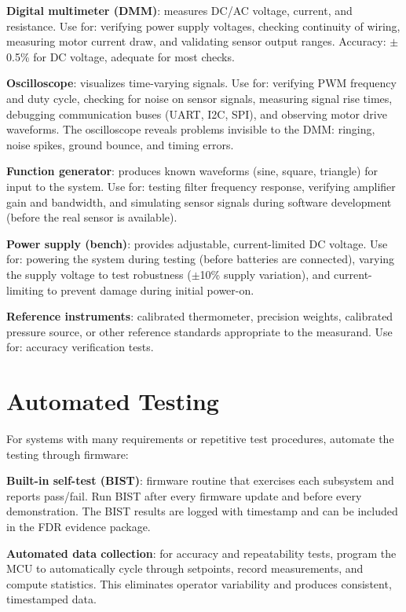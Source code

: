 \documentclass[11pt,letterpaper,twoside,openany]{book}
\begin{document}
\textbf{Digital multimeter (DMM)}: measures DC/AC voltage, current, and resistance. Use for: verifying power supply voltages, checking continuity of wiring, measuring motor current draw, and validating sensor output ranges. Accuracy: $\pm$0.5\% for DC voltage, adequate for most checks.

\textbf{Oscilloscope}: visualizes time-varying signals. Use for: verifying PWM frequency and duty cycle, checking for noise on sensor signals, measuring signal rise times, debugging communication buses (UART, I2C, SPI), and observing motor drive waveforms. The oscilloscope reveals problems invisible to the DMM: ringing, noise spikes, ground bounce, and timing errors.

\textbf{Function generator}: produces known waveforms (sine, square, triangle) for input to the system. Use for: testing filter frequency response, verifying amplifier gain and bandwidth, and simulating sensor signals during software development (before the real sensor is available).

\textbf{Power supply (bench)}: provides adjustable, current-limited DC voltage. Use for: powering the system during testing (before batteries are connected), varying the supply voltage to test robustness ($\pm$10\% supply variation), and current-limiting to prevent damage during initial power-on.

\textbf{Reference instruments}: calibrated thermometer, precision weights, calibrated pressure source, or other reference standards appropriate to the measurand. Use for: accuracy verification tests.

\section{Automated Testing}
For systems with many requirements or repetitive test procedures, automate the testing through firmware:

\textbf{Built-in self-test (BIST)}: firmware routine that exercises each subsystem and reports pass/fail. Run BIST after every firmware update and before every demonstration. The BIST results are logged with timestamp and can be included in the FDR evidence package.

\textbf{Automated data collection}: for accuracy and repeatability tests, program the MCU to automatically cycle through setpoints, record measurements, and compute statistics. This eliminates operator variability and produces consistent, timestamped data.
\end{document}
